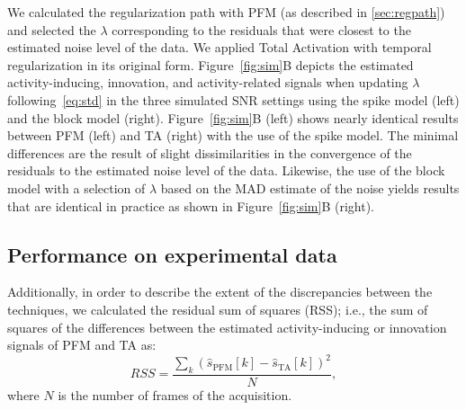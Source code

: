 
We calculated the regularization path with PFM (as described in \ref{sec:regpath}) and selected the \(\lambda\) corresponding to the residuals that were closest to the estimated noise level of the data. We applied Total Activation with temporal regularization in its original form. Figure~\ref{fig:sim}B depicts the estimated activity-inducing, innovation, and activity-related signals when updating \(\lambda\) following~\eqref{eq:std} in the three simulated SNR settings using the spike model (left) and the block model (right). Figure~\ref{fig:sim}B (left) shows nearly identical results between PFM (left) and TA (right) with the use of the spike model. The minimal differences are the result of slight dissimilarities in the convergence of the residuals to the estimated noise level of the data. Likewise, the use of the block model with a selection of \(\lambda\) based on the MAD estimate of the noise yields results that are identical in practice as shown in Figure~\ref{fig:sim}B (right).

\subsection{Performance on experimental data}

Additionally, in order to describe the extent of the discrepancies between the techniques, we calculated the residual sum of squares (RSS); i.e., the sum of squares of the differences between the estimated activity-inducing or innovation signals of PFM and TA as:
\begin{equation}
    RSS = \frac{\sum_{k}{(\hat{s}_\text{PFM}[k] - \hat{s}_\text{TA}[k])^2}}{N},
\end{equation}
where \(N\) is the number of frames of the acquisition.

